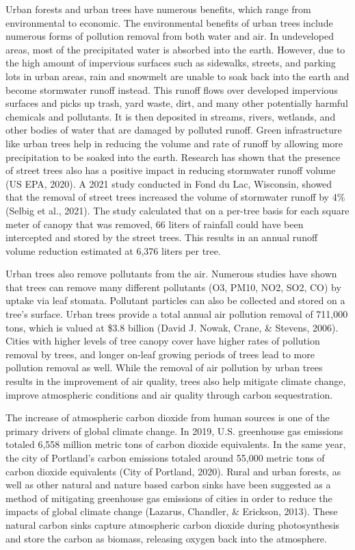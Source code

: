 \documentclass[12pt,twoside]{reedthesis}
\begin{document}
Urban forests and urban trees have numerous benefits, which range from environmental to economic. The environmental benefits of urban trees include numerous forms of pollution removal from both water and air. In undeveloped areas, most of the precipitated water is absorbed into the earth. However, due to the high amount of impervious surfaces such as sidewalks, streets, and parking lots in urban areas, rain and snowmelt are unable to soak back into the earth and become stormwater runoff instead. This runoff flows over developed impervious surfaces and picks up trash, yard waste, dirt, and many other potentially harmful chemicals and pollutants. It is then deposited in streams, rivers, wetlands, and other bodies of water that are damaged by polluted runoff. Green infrastructure like urban trees help in reducing the volume and rate of runoff by allowing more precipitation to be soaked into the earth. Research has shown that the presence of street trees also has a positive impact in reducing stormwater runoff volume (US EPA, 2020). A 2021 study conducted in Fond du Lac, Wisconsin, showed that the removal of street trees increased the volume of stormwater runoff by 4\% (Selbig et al., 2021). The study calculated that on a per-tree basis for each square meter of canopy that was removed, 66 liters of rainfall could have been intercepted and stored by the street trees. This results in an annual runoff volume reduction estimated at 6,376 liters per tree.

Urban trees also remove pollutants from the air. Numerous studies have shown that trees can remove many different pollutants (O3, PM10, NO2, SO2, CO) by uptake via leaf stomata. Pollutant particles can also be collected and stored on a tree's surface. Urban trees provide a total annual air pollution removal of 711,000 tons, which is valued at \$3.8 billion (David J. Nowak, Crane, \& Stevens, 2006). Cities with higher levels of tree canopy cover have higher rates of pollution removal by trees, and longer on-leaf growing periods of trees lead to more pollution removal as well. While the removal of air pollution by urban trees results in the improvement of air quality, trees also help mitigate climate change, improve atmospheric conditions and air quality through carbon sequestration.

The increase of atmospheric carbon dioxide from human sources is one of the primary drivers of global climate change. In 2019, U.S. greenhouse gas emissions totaled 6,558 million metric tons of carbon dioxide equivalents. In the same year, the city of Portland's carbon emissions totaled around 55,000 metric tons of carbon dioxide equivalents (City of Portland, 2020). Rural and urban forests, as well as other natural and nature based carbon sinks have been suggested as a method of mitigating greenhouse gas emissions of cities in order to reduce the impacts of global climate change (Lazarus, Chandler, \& Erickson, 2013). These natural carbon sinks capture atmospheric carbon dioxide during photosynthesis and store the carbon as biomass, releasing oxygen back into the atmosphere.
\end{document}
